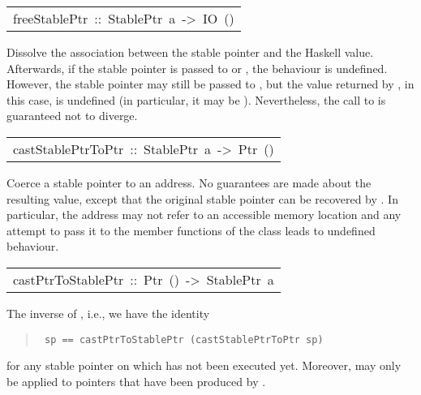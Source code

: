 \begin{haddockdesc}
\item[\begin{tabular}{@{}l}
freeStablePtr\ ::\ StablePtr\ a\ ->\ IO\ ()
\end{tabular}]\haddockbegindoc
Dissolve the association between the stable pointer and the Haskell
 value. Afterwards, if the stable pointer is passed to
  or , the behaviour is
 undefined.  However, the stable pointer may still be passed to
 , but the  value returned
 by , in this case, is undefined (in particular,
 it may be ).  Nevertheless, the call
 to  is guaranteed not to diverge.
\par

\end{haddockdesc}
\begin{haddockdesc}
\item[\begin{tabular}{@{}l}
castStablePtrToPtr\ ::\ StablePtr\ a\ ->\ Ptr\ ()
\end{tabular}]\haddockbegindoc
Coerce a stable pointer to an address. No guarantees are made about
 the resulting value, except that the original stable pointer can be
 recovered by .  In particular, the address may not
 refer to an accessible memory location and any attempt to pass it to
 the member functions of the class  leads to
 undefined behaviour.
\par

\end{haddockdesc}
\begin{haddockdesc}
\item[\begin{tabular}{@{}l}
castPtrToStablePtr\ ::\ Ptr\ ()\ ->\ StablePtr\ a
\end{tabular}]\haddockbegindoc
The inverse of , i.e., we have the identity
\par
\begin{quote}
{\haddockverb\begin{verbatim}
 sp == castPtrToStablePtr (castStablePtrToPtr sp)
\end{verbatim}}
\end{quote}
for any stable pointer  on which  has
 not been executed yet.  Moreover,  may
 only be applied to pointers that have been produced by
 .
\par

\end{haddockdesc}
